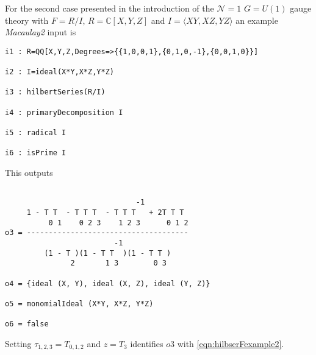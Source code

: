 \documentclass[main.tex]{subfiles}
\begin{document}
For the second case presented in the introduction of the $\mathcal{N}=1$ $G=U(1)$ gauge theory with $F=R/I$, $R=\mathbb{C}[X,Y,Z]$ and $I=\langle XY,XZ,YZ\rangle$ an example \textit{Macaulay2} input is
\begin{verbatim}
i1 : R=QQ[X,Y,Z,Degrees=>{{1,0,0,1},{0,1,0,-1},{0,0,1,0}}]

i2 : I=ideal(X*Y,X*Z,Y*Z)

i3 : hilbertSeries(R/I)

i4 : primaryDecomposition I

i5 : radical I

i6 : isPrime I
\end{verbatim}
This outputs
\begin{verbatim}

                              -1
     1 - T T  - T T T  - T T T   + 2T T T
          0 1    0 2 3    1 2 3      0 1 2
o3 = -------------------------------------
                         -1
         (1 - T )(1 - T T  )(1 - T T )
               2       1 3        0 3

o4 = {ideal (X, Y), ideal (X, Z), ideal (Y, Z)}

o5 = monomialIdeal (X*Y, X*Z, Y*Z)

o6 = false
\end{verbatim}
Setting $\tau_{1,2,3}=T_{0,1,2}$ and $z=T_3$ identifies $o3$ with \eqref{eqn:hilbserFexample2}.
\end{document}
